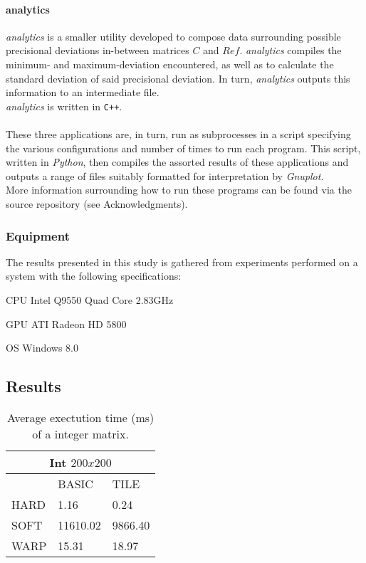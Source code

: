 \documentclass[fleqn,10pt]{SelfArx} %
\begin{document}
\paragraph{analytics}
\textit{analytics} is a smaller utility developed to compose data surrounding possible precisional deviations in-between matrices $C$ and $Ref$. \textit{analytics} compiles the minimum- and maximum-deviation encountered, as well as to calculate the standard deviation of said precisional deviation. In turn, \textit{analytics} outputs this information to an intermediate file.\\
\textit{analytics} is written in \texttt{C++}.\\
\\
\noindent
These three applications are, in turn, run as subprocesses in a script specifying the various configurations and number of times to run each program. This script, written in \textit{Python}, then compiles the assorted results of these applications and outputs a range of files suitably formatted for interpretation by \textit{Gnuplot}.\\
More information surrounding how to run these programs can be found via the source repository (see Acknowledgments).

\subsubsection{Equipment}
\label{sec:contribution:equipment}
The results presented in this study is gathered from experiments performed on a system with the following specifications:
\begin{description*}
	\item[CPU]	Intel Q9550 Quad Core 2.83GHz
	\item[GPU]	ATI Radeon HD 5800
	\item[OS]	Windows 8.0
\end{description*}

\subsection{Results}
\label{sec:contribution:results}

\begin{table}
\begin{center}
	\begin{tabular}{|l|l|l|}
		\hline
		\multicolumn{3}{|c|}{Int $200x200$} \\
		\hline
		~    & BASIC & TILE \\	\hline
		HARD	& 1.16    	& 0.24   	 \\	\hline
		SOFT	& 11610.02 	& 9866.40    	\\	\hline
		WARP & 15.31     	& 18.97   	\\	\hline
	\end{tabular}
	\label{tab:contribution:results:summaryint}
	\caption{Average exectution time (ms) of a integer matrix.}
\end{center}
\end{table}
\end{document}
